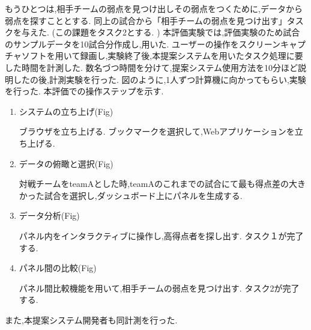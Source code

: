 \documentclass[sotsuron]{kuee}
\begin{document}
					もうひとつは,相手チームの弱点を見つけ出しその弱点をつくために,データから弱点を探すこととする. 
					同上の試合から「相手チームの弱点を見つけ出す」タスクを与えた. (この課題をタスク2とする. )
					本評価実験では,評価実験のため試合のサンプルデータを10試合分作成し,用いた. 
					ユーザーの操作をスクリーンキャプチャソフトを用いて録画し,実験終了後,本提案システムを用いたタスク処理に要した時間を計測した. 
					数名づつ時間を分けて,提案システム使用方法を10分ほど説明したの後,計測実験を行った. 
					図のように,1人ずつ計算機に向かってもらい,実験を行った. 
					本評価での操作ステップを示す. 
					\begin{enumerate}
						\item システムの立ち上げ(Fig)
						
						ブラウザを立ち上げる. 
						ブックマークを選択して,Webアプリケーションを立ち上げる. 
						\item データの俯瞰と選択(Fig)
						
						対戦チームをteamAとした時,teamAのこれまでの試合にて最も得点差の大きかった試合を選択し,ダッシュボード上にパネルを生成する. 
						\item データ分析(Fig)
						
						パネル内をインタラクティブに操作し,高得点者を探し出す. 
						タスク１が完了する. 
						\item パネル間の比較(Fig)
						
						パネル間比較機能を用いて,相手チームの弱点を見つけ出す. 
						タスク2が完了する. 
					\end{enumerate}
					また,本提案システム開発者も同計測を行った. 
\end{document}
